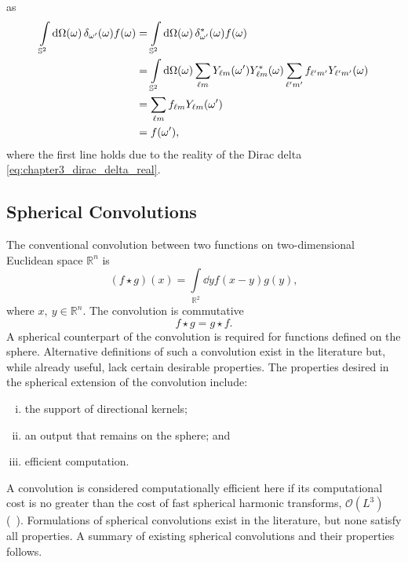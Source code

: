 %
as
%
\begin{align}
	\integrateSphere{\omega} \pixel{\delta_{\omega'}} \pixel{f}
	 & = \integrateSphere{\omega} \pixel{\conj{\delta_{\omega'}}} \pixel{f} \nonumber{}                                                                                \\
	 & = \integrateSphere{\omega} \harmonicSum \pixel[']{\harmonic{Y}} \pixel{\conj{\harmonic{Y}}} \harmonicSum['] \harmonic[']{f} \pixel{\harmonic[']{Y}} \nonumber{} \\
	 & = \harmonicSum \harmonic{f} \pixel[']{\harmonic{Y}} \nonumber{}                                                                                                 \\
	 & = \pixel[']{f},
\end{align}
%
where the first line holds due to the reality of the Dirac delta \cref{eq:chapter3_dirac_delta_real}.

\subsection{Spherical Convolutions}\label{sec:chapter3_spherical_convolutions}

The conventional convolution between two functions on two-dimensional Euclidean space \(\mathbb{R}^{n}\) is
%
\begin{equation}
	(f \star g)(x)
	= \int\limits_{\mathbb{R}^{2}} \dd{y} f(x-y) g(y),
\end{equation}
%
where \(x,\ y \in \mathbb{R}^{n}\).
The convolution is commutative
%
\begin{equation}
	f \star g
	= g \star f.
\end{equation}
%
A spherical counterpart of the convolution is required for functions defined on the sphere.
Alternative definitions of such a convolution exist in the literature but, while already useful, lack certain desirable properties.
The properties desired in the spherical extension of the convolution include:
%
\begin{enumerate}[(i),nosep,left=\parindent]
	\item the support of directional kernels;
	\item an output that remains on the sphere; and
	\item efficient computation.
\end{enumerate}
%
A convolution is considered computationally efficient here if its computational cost is no greater than the cost of fast spherical harmonic transforms, \ie{} \(\mathcal{O}(L^{3})\) (\eg{}~\cite{Driscoll1994,McEwen2011}).
Formulations of spherical convolutions exist in the literature, but none satisfy all properties.
A summary of existing spherical convolutions and their properties follows.

